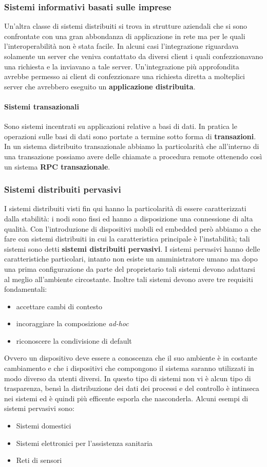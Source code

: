 \subsubsection{Sistemi informativi basati sulle imprese}
Un'altra classe di sistemi distribuiti si trova in strutture aziendali che si sono confrontate con una gran abbondanza di applicazione in rete ma per le quali l'interoperabilità non è stata facile. In alcuni casi l'integrazione riguardava solamente un server che veniva contattato da diversi client i quali confezzionavano una richiesta e la inviavano a tale server. Un'integrazione più approfondita avrebbe permesso ai client di confezzionare una richiesta diretta a molteplici server che avrebbero eseguito un \textbf{applicazione distribuita}.
\paragraph{Sistemi transazionali} Sono sistemi incentrati su applicazioni relative a basi di dati. In pratica le operazioni sulle basi di dati sono portate a termine sotto forma di \textbf{transazioni}. In un sistema distribuito transazionale abbiamo la particolarità che all'interno di una transazione possiamo avere delle chiamate a procedura remote ottenendo così un sistema \textbf{RPC transazionale}.
\subsubsection{Sistemi distribuiti pervasivi}
I sistemi distribuiti visti fin qui hanno la particolarità di essere caratterizzati dalla stabilità: i nodi sono fissi ed hanno a disposizione una connessione di alta qualità. Con l'introduzione di dispositivi mobili ed embedded però abbiamo a che fare con sistemi distribuiti in cui la caratteristica principale è l'instabilità; tali sistemi sono detti \textbf{sistemi distribuiti pervasivi}. I sistemi pervasivi hanno delle caratteristiche particolari, intanto non esiste un amministratore umano ma dopo una prima configurazione da parte del proprietario tali sistemi devono adattarsi al meglio all'ambiente circostante. Inoltre tali sistemi devono avere tre requisiti fondamentali:
\begin{itemize}
\item accettare cambi di contesto
\item incoraggiare la composizione \emph{ad-hoc}
\item riconoscere la condivisione di default
\end{itemize}
Ovvero un dispositivo deve essere a conoscenza che il suo ambiente è in costante cambiamento e che i dispositivi che compongono il sistema saranno utilizzati in modo diverso da utenti diversi.
In questo tipo di sistemi non vi è alcun tipo di trasparenza, bensì la distribuzione dei dati dei processi e del controllo è intinseca nei sistemi ed è quindi più efficente esporla che nasconderla.
Alcuni esempi di sistemi pervasivi sono:
\begin{itemize}
\item Sistemi domestici
\item Sistemi elettronici per l'assistenza sanitaria
\item Reti di sensori
\end{itemize}